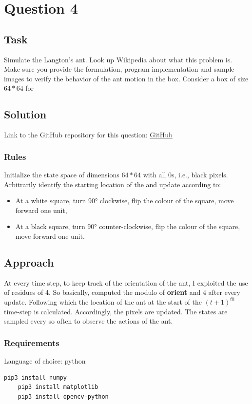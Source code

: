 \section{Question 4}

\subsection{Task}
Simulate the Langton’s ant. Look up Wikipedia about what this problem is. Make sure you provide the formulation, program implementation and sample images to verify the behavior of the ant motion in the box. Consider a box of size $64*64$ for


\subsection{Solution}

Link to the GitHub repository for this question: \href{https://github.com/Xerefic/MM2090-Solutions/tree/master/Final_Assignment/question_4}{GitHub}

\subsubsection{Rules}
Initialize the state space of dimensions $64*64$ with all 0s, i.e., black pixels. Arbitrarily identify the starting location of the and update according to:
\begin{itemize}
	\item At a white square, turn 90° clockwise, flip the colour of the square, move forward one unit,
	\item At a black square, turn 90° counter-clockwise, flip the colour of the square, move forward one unit.
\end{itemize}

\subsection{Approach}
At every time step, to keep track of the orientation of the ant, I exploited the use of residues of 4. So basically, computed the modulo of \textbf{orient} and 4 after every update. Following which the location of the ant at the start of the $\left(t+1\right)^{th}$ time-step is calculated. Accordingly, the pixels are updated. The states are sampled every so often to observe the actions of the ant.


\subsubsection{Requirements}
Language of choice: python
\begin{lstlisting}[language=bash]
	pip3 install numpy
	pip3 install matplotlib
	pip3 install opencv-python
\end{lstlisting}

